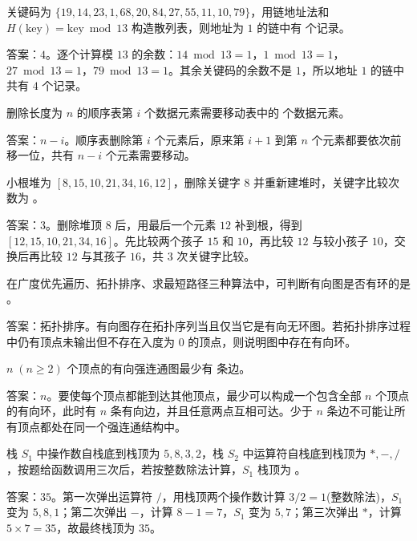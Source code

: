 \begin{question}
关键码为 $\{19,14,23,1,68,20,84,27,55,11,10,79\}$，用链地址法和 $H(\mathrm{key})=\mathrm{key}\bmod 13$ 构造散列表，则地址为 $1$ 的链中有 \blank 个记录。
\begin{solution}
答案：$4$。逐个计算模 $13$ 的余数：$14\bmod13=1$，$1\bmod13=1$，$27\bmod13=1$，$79\bmod13=1$。其余关键码的余数不是 $1$，所以地址 $1$ 的链中共有 $4$ 个记录。
\end{solution}
\end{question}

\begin{question}
删除长度为 $n$ 的顺序表第 $i$ 个数据元素需要移动表中的 \blank 个数据元素。
\begin{solution}
答案：$n-i$。顺序表删除第 $i$ 个元素后，原来第 $i+1$ 到第 $n$ 个元素都要依次前移一位，共有 $n-i$ 个元素需要移动。
\end{solution}
\end{question}

\begin{question}
小根堆为 $[8,15,10,21,34,16,12]$，删除关键字 $8$ 并重新建堆时，关键字比较次数为 \blank。
\begin{solution}
答案：$3$。删除堆顶 $8$ 后，用最后一个元素 $12$ 补到根，得到 $[12,15,10,21,34,16]$。先比较两个孩子 $15$ 和 $10$，再比较 $12$ 与较小孩子 $10$，交换后再比较 $12$ 与其孩子 $16$，共 $3$ 次关键字比较。
\end{solution}
\end{question}

\begin{question}
在广度优先遍历、拓扑排序、求最短路径三种算法中，可判断有向图是否有环的是 \blank。
\begin{solution}
答案：拓扑排序。有向图存在拓扑序列当且仅当它是有向无环图。若拓扑排序过程中仍有顶点未输出但不存在入度为 $0$ 的顶点，则说明图中存在有向环。
\end{solution}
\end{question}

\begin{question}
$n\;(n\ge2)$ 个顶点的有向强连通图最少有 \blank 条边。
\begin{solution}
答案：$n$。要使每个顶点都能到达其他顶点，最少可以构成一个包含全部 $n$ 个顶点的有向环，此时有 $n$ 条有向边，并且任意两点互相可达。少于 $n$ 条边不可能让所有顶点都处在同一个强连通结构中。
\end{solution}
\end{question}

\begin{question}
栈 $S_1$ 中操作数自栈底到栈顶为 $5,8,3,2$，栈 $S_2$ 中运算符自栈底到栈顶为 $*, -, /$，按题给函数调用三次后，若按整数除法计算，$S_1$ 栈顶为 \blank。
\begin{solution}
答案：$35$。第一次弹出运算符 $/$，用栈顶两个操作数计算 $3/2=1$(整数除法)，$S_1$ 变为 $5,8,1$；第二次弹出 $-$，计算 $8-1=7$，$S_1$ 变为 $5,7$；第三次弹出 $*$，计算 $5\times7=35$，故最终栈顶为 $35$。
\end{solution}
\end{question}

